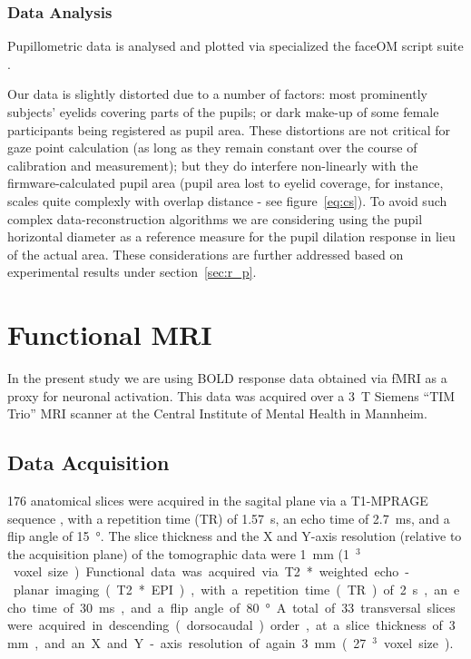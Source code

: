	    \subsubsection{Data Analysis}
		Pupillometric data is analysed and plotted via specialized the faceOM script suite \citep{faceOM}.
		
		Our data is slightly distorted due to a number of factors: most prominently subjects' eyelids covering parts of the pupils; or dark make-up of some female participants being registered as pupil area.
		These distortions are not critical for gaze point calculation (as long as they remain constant over the course of calibration and measurement); 
		but they do interfere non-linearly with the firmware-calculated pupil area 
		(pupil area lost to eyelid coverage, for instance, scales quite complexly with overlap distance - see figure~\ref{eq:cs}).
		To avoid such complex data-reconstruction algorithms we are considering using the pupil horizontal diameter as a reference measure for the pupil dilation response in lieu of the actual area.
		These considerations are further addressed based on experimental results under section~\ref{sec:r_p}.
	    
    \section{Functional MRI}\label{sec:m_fmri}
	In the present study we are using BOLD response data obtained via fMRI as a proxy for neuronal activation.
	This data was acquired over a \SI{3}{\tesla} Siemens “TIM Trio” MRI scanner at the Central Institute of Mental Health in Mannheim.
	\subsection{Data Acquisition}
	    176 anatomical slices were acquired in the sagital plane via a T1-MPRAGE sequence \citep{Brant-Zawadzki1992}, with a repetition time (TR) of \SI{1.57}{\second}, an echo time of \SI{2.7}{\milli\second}, and a flip angle of \SI{15}{\degree}.
	    The slice thickness and the X and Y-axis resolution (relative to the acquisition plane) of the tomographic data were \SI{1}{\milli\metre} (\SI{1}{\milli\metre$^3$} voxel size).
	    
	    Functional data was acquired via T2* weighted echo-planar imaging (T2* EPI), with a repetition time (TR) of \SI{2}{\second}, an echo time of \SI{30}{\milli\second}, and a flip angle of \SI{80}{\degree}.
	    A total of 33 transversal slices were acquired in descending (dorsocaudal) order, at a slice thickness of \SI{3}{\milli\metre}, and an X and Y-axis resolution of again \SI{3}{\milli\metre} (\SI{27}{\milli\metre$^3$} voxel size).
